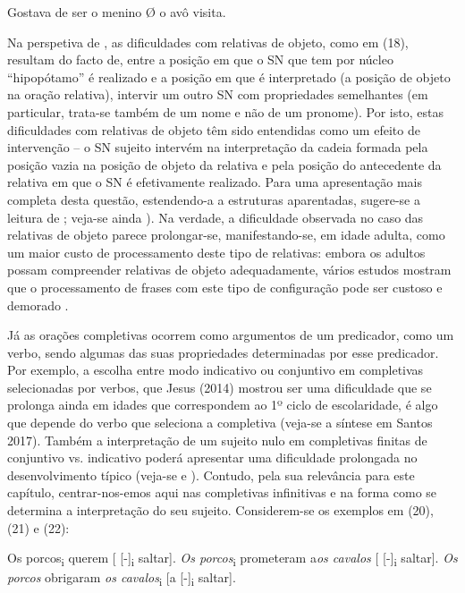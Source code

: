 \documentclass[output=paper,colorlinks,citecolor=brown,booklanguage=portuguese]{langscibook}
\begin{document}
\ea
    \label{ex:13:19} Gostava de ser o menino Ø o avô visita.
\z

Na perspetiva de \citet{Friedmann2009}, as dificuldades com relativas de objeto, como em (18), resultam do facto de, entre a posição em que o SN que tem por núcleo “hipopótamo” é realizado e a posição em que é interpretado (a posição de objeto na oração relativa), intervir um outro SN com propriedades semelhantes (em particular, trata-se também de um nome e não de um pronome). Por isto, estas dificuldades com relativas de objeto têm sido entendidas como um efeito de intervenção – o SN sujeito intervém na interpretação da cadeia formada pela posição vazia na posição de objeto da relativa e pela posição do antecedente da relativa em que o SN é efetivamente realizado. Para uma apresentação mais completa desta questão, estendendo-a a estruturas aparentadas, sugere-se a leitura de \citet{Lobo2017}; veja-se ainda ). Na verdade, a dificuldade observada no caso das relativas de objeto parece prolon\-gar-se, manifestando-se, em idade adulta, como um maior custo de processamento deste tipo de relativas: embora os adultos possam compreender relativas de objeto adequadamente, vários estudos mostram que o processamento de frases com este tipo de configuração pode ser custoso e demorado \citep{King1991, Gordon2001, Costa2012, Delgado2021}.

Já as orações completivas ocorrem como argumentos de um predicador, como um verbo, sendo algumas das suas propriedades determinadas por esse predicador. Por exemplo, a escolha entre modo indicativo ou conjuntivo em completivas selecionadas por verbos, que Jesus (2014) mostrou ser uma dificuldade que se prolonga ainda em idades que correspondem ao 1º ciclo de escolaridade, é algo que depende do verbo que seleciona a completiva (veja-se a síntese em Santos 2017). Também a interpretação de um sujeito nulo em completivas finitas de conjuntivo vs. indicativo poderá apresentar uma dificuldade prolongada no desenvolvimento típico (veja-se \citealp{Silva2015} e \citealp{Gamas2016}). Contudo, pela sua relevância para este capítulo, centrar-nos-emos aqui nas completivas infinitivas e na forma como se determina a interpretação do seu sujeito. Considerem-se os exemplos em (20), (21) e (22):

\ea
    \label{ex:13:20} Os porcos\textsubscript{i} querem [ [-]\textsubscript{i} saltar].
    \z
    \ea
\label{ex:13:21} \emph{Os porcos}\textsubscript{i} prometeram a\emph{os cavalos} [ [-]\textsubscript{i}  saltar].
\z
\ea
\label{ex:13:22} \emph{Os porcos} obrigaram \emph{os cavalos}\textsubscript{i} [a [-]\textsubscript{i} saltar].
\z
\end{document}
